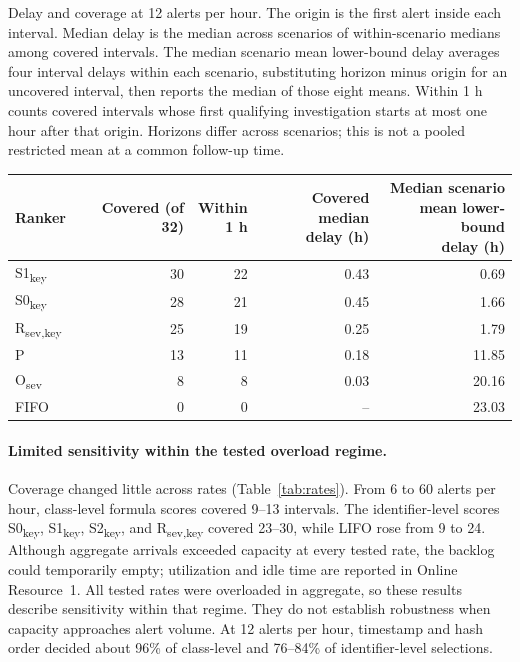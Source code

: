 \documentclass[pdflatex,sn-basic,Numbered]{sn-jnl}
\newcommand{\key}{\textsubscript{key}}
\newcommand{\Rsev}{R\textsubscript{sev,key}}
\begin{document}
\begin{tableorg}[t]
\centering
\caption{Delay and coverage at 12 alerts per hour. The origin is the first alert inside each interval. Median delay is the median across scenarios of within-scenario medians among covered intervals. The median scenario mean lower-bound delay averages four interval delays within each scenario, substituting horizon minus origin for an uncovered interval, then reports the median of those eight means. Within 1 h counts covered intervals whose first qualifying investigation starts at most one hour after that origin. Horizons differ across scenarios; this is not a pooled restricted mean at a common follow-up time.}
\label{tab:delay}
\small
\begin{tabular}{lrrrr}
\toprule
Ranker & Covered (of 32) & \shortstack{Within\\1 h} & \shortstack{Covered median\\delay (h)} & \shortstack{Median scenario\\mean lower-bound\\delay (h)} \\
\midrule
S1\textsubscript{key} & 30 & 22 & 0.43 & 0.69 \\
S0\textsubscript{key} & 28 & 21 & 0.45 & 1.66 \\
R\textsubscript{sev,key} & 25 & 19 & 0.25 & 1.79 \\
P & 13 & 11 & 0.18 & 11.85 \\
O\textsubscript{sev} & 8 & 8 & 0.03 & 20.16 \\
FIFO & 0 & 0 & -- & 23.03 \\
\bottomrule
\end{tabular}

\unskip
\end{tableorg}

\paragraph{Limited sensitivity within the tested overload regime.} Coverage changed little across rates (Table~\ref{tab:rates}). From 6 to 60 alerts per hour, class-level formula scores covered 9--13 intervals. The identifier-level scores S0\key, S1\key, S2\key, and \Rsev{} covered 23--30, while LIFO rose from 9 to 24. Although aggregate arrivals exceeded capacity at every tested rate, the backlog could temporarily empty; utilization and idle time are reported in Online Resource~1. All tested rates were overloaded in aggregate, so these results describe sensitivity within that regime. They do not establish robustness when capacity approaches alert volume. At 12 alerts per hour, timestamp and hash order decided about 96\% of class-level and 76--84\% of identifier-level selections.
\end{document}
